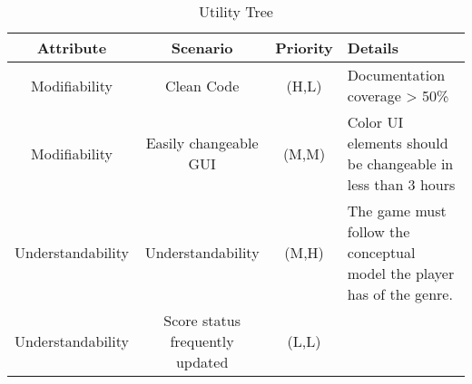 \begin{table}[H]
	\begin{center}
		\begin{tabular}{| c | c | c | p{3cm}|}
    		\hline
			\textbf{Attribute}		&	\textbf{Scenario} 				&   \textbf{Priority} 	& \textbf{Details} 			\\															
			\hline
			Modifiability			& 	Clean Code						& 	(H,L)		& Documentation coverage > 50\%\\
			Modifiability			&	Easily changeable GUI			& 	(M,M)		& Color UI elements should be changeable in less than 3 hours \\
			Understandability		& 	Understandability				& 	(M,H)		& The game must follow the conceptual model the player has of the genre. \\
			Understandability 		& 	Score status frequently updated	& 	(L,L)		& \\
			\hline
    	\end{tabular}
	\end{center}
	\label{tab:Utility_tree}
	\caption{Utility Tree}
\end{table}